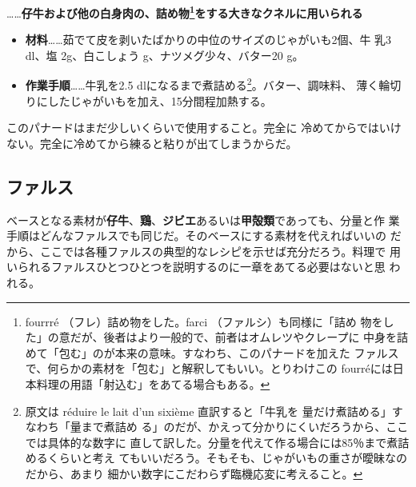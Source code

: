 \begin{recette}
\ldots{}\ldots{}\textbf{仔牛および他の白身肉の、詰め物\footnote{fourrré
  （フレ）詰め物をした。farci （ファルシ）も同様に「詰め
  物をした」の意だが、後者はより一般的で、前者はオムレツやクレープに
  中身を詰めて「包む」のが本来の意味。すなわち、このパナードを加えた
  ファルスで、何らかの素材を「包む」と解釈してもいい。とりわけこの
  fourréには日本料理の用語「射込む」をあてる場合もある。}をする大きなクネルに用いられる}

\begin{itemize}
\item
  \textbf{材料}\ldots{}\ldots{}茹でて皮を剥いたばかりの中位のサイズのじゃがいも2個、牛
  乳3 dl、塩 2g、白こしょう\undemi{} g、ナツメグ少々、バター20 g。
\item
  \textbf{作業手順}\ldots{}\ldots{}牛乳を2.5
  dlになるまで煮詰める\footnote{原文は réduire le lait d'un sixième
    直訳すると「牛乳を
    \unsixieme{}量だけ煮詰める」すなわち「\cinqsixiemes{}量まで煮詰め
    る」のだが、かえって分かりにくいだろうから、ここでは具体的な数字に
    直して訳した。分量を代えて作る場合には85％まで煮詰めるくらいと考え
    てもいいだろう。そもそも、じゃがいもの重さが曖昧なのだから、あまり
    細かい数字にこだわらず臨機応変に考えること。}。バター、調味料、
  薄く輪切りにしたじゃがいもを加え、15分間程加熱する。
\end{itemize}

このパナードはまだ少しいくらいで使用すること。完全に
冷めてからではいけない。完全に冷めてから練ると粘りが出てしまうからだ。
\end{recette}
\hypertarget{farces}{%
\subsection{ファルス}\label{farces}}

\vspace*{1\zw}

 

ベースとなる素材が\textbf{仔牛}、\textbf{鶏}、\textbf{ジビエ}あるいは\textbf{甲殻類}であっても、分量と作
業手順はどんなファルスでも同じだ。そのベースにする素材を代えればいいの
だから、ここでは各種ファルスの典型的なレシピを示せば充分だろう。料理で
用いられるファルスひとつひとつを説明するのに一章をあてる必要はないと思
われる。

